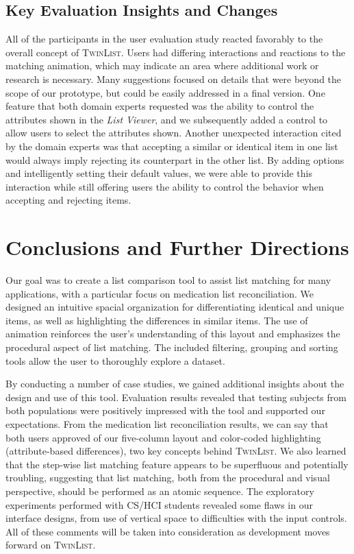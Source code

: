 \documentclass{chi2009}
\newcommand{\TwinList}{\textsc{TwinList}}
\newcommand{\ListViewer}{\textit{List Viewer}}
\begin{document}
\subsection{Key Evaluation Insights and Changes}
All of the participants in the user evaluation study reacted favorably to the overall concept of \TwinList. Users had differing interactions and reactions to the matching animation, which may indicate an area where additional work or research is necessary. Many suggestions focused on details that were beyond the scope of our prototype, but could be easily addressed in a final version. One feature that both domain experts requested was the ability to control the attributes shown in the \ListViewer, and we subsequently added a control to allow users to select the attributes shown. Another unexpected interaction cited by the domain experts was that accepting a similar or identical item in one list would always imply rejecting its counterpart in the other list. By adding options and intelligently setting their default values, we were able to provide this interaction while still offering users the ability to control the behavior when accepting and rejecting items. 

\section{Conclusions and Further Directions}
Our goal was to create a list comparison tool to assist list matching for many applications, with a particular focus on medication list reconciliation. We designed an intuitive spacial organization for differentiating identical and unique items, as well as highlighting the differences in similar items. The use of animation reinforces the user's understanding of this layout and emphasizes the procedural aspect of list matching. The included filtering, grouping and sorting tools allow the user to thoroughly explore a dataset.

By conducting a number of case studies, we gained additional insights about the design and use of this tool. Evaluation results revealed that testing subjects from both populations were positively impressed with the tool and supported our expectations. From the medication list reconciliation results, we can say that both users approved of our five-column layout and color-coded highlighting (attribute-based differences), two key concepts behind \TwinList. We also learned that the step-wise list matching feature appears to be superfluous and potentially troubling, suggesting that list matching, both from the procedural and visual perspective, should be performed as an atomic sequence. The exploratory experiments performed with CS/HCI students revealed some flaws in our interface designs, from use of vertical space to difficulties with the input controls. All of these comments will be taken into consideration as development moves forward on \TwinList.
 
\end{document}
